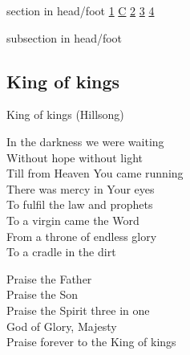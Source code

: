 \documentclass{beamer}
\begin{document}
{
{ 
 {
 \begin{beamercolorbox}[ht=4.5ex,dp=1.5ex,%
      leftskip=.3cm,rightskip=.3cm plus1fil]{section in head/foot}
 \fontsize{12}{25}\selectfont 
\hyperlink{King of kings[](Hillsong)1}{1}
\hyperlink{King of kings[](Hillsong)C}{C}
\hyperlink{King of kings[](Hillsong)2}{2}
\hyperlink{King of kings[](Hillsong)3}{3}
\hyperlink{King of kings[](Hillsong)4}{4}
 
 \end{beamercolorbox}%
  \begin{beamercolorbox}[ht=2.5ex,dp=1.125ex,%
   leftskip=.3cm,rightskip=.3cm plus1fil]{subsection in head/foot}
   \insertauthor
 \end{beamercolorbox}%
 }
}
\subsection{ King of kings }

\hypertarget{King of kings[](Hillsong)1}{}
\begin{frame}{King of kings (Hillsong)}
\fontsize{ 18 }{ 23 }\selectfont

In the darkness we were waiting\\ 
Without hope without light\\ 
Till from Heaven You came running\\ 
There was mercy in Your eyes\\ 
To fulfil the law and prophets\\ 
To a virgin came the Word\\ 
From a throne of endless glory\\ 
To a cradle in the dirt 

\end{frame}

\hypertarget{King of kings[](Hillsong)C}{}
\begin{frame}{}
\fontsize{ 18 }{ 23 }\selectfont

Praise the Father\\ 
Praise the Son\\ 
Praise the Spirit three in one\\ 
God of Glory, Majesty\\ 
Praise forever to the King of kings 

\end{frame}

\hypertarget{King of kings[](Hillsong)2}{}
\begin{frame}{}
\fontsize{ 18 }{ 23 }\selectfont


\end{frame}}
\end{document}
